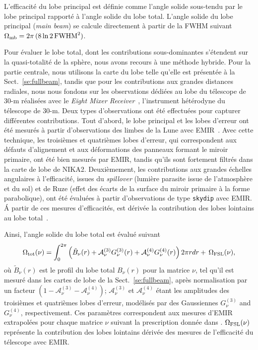 L'efficacité du lobe principal est définie comme l'angle solide
sous-tendu par le lobe principal rapporté à l'angle solide du lobe
total. L'angle solide du lobe principal (\emph{main beam}) se calcule
directement à partir de la FWHM suivant $\Omega_{\rm{mb}} = 2\pi\,
(8\ln{2} \, \rm{FWHM}^2)$.

Pour évaluer le lobe total, dont les contributions sous-dominantes
s'étendent sur la quasi-totalité de la sphère, nous avons recours à
une méthode hybride. Pour la partie centrale, nous utilisons la carte
du lobe telle qu'elle est présentée à la Sect.~\ref{se:fullbeam},
tandis que pour les contributions aux grandes distances radiales, nous
nous fondons sur les observations dédiées au lobe du télescope de 30-m
réalisées avec le \emph{Eight Mixer
  Receiver}~\citep[EMIR][]{Carter2012}, l'instrument hétérodyne du
télescope de 30-m. Deux types d'observations ont été effectuées pour
capturer différentes contributions. Tout d'abord, le lobe principal et
les lobes d'erreur ont été mesurés à partir d'observations des limbes
de la Lune avec EMIR~\citep{Kramer2013}. Avec cette technique, les
troisièmes et quatrièmes lobes d'erreur, qui correspondent aux défauts
d'alignement et aux déformations des panneaux formant le miroir
primaire, ont été bien mesurés par EMIR, tandis qu'ils sont fortement
filtrés dans la carte de lobe de NIKA2. Deuxièmement, les
contributions aux grandes échelles angulaires à l'efficacité, issues
du \emph{spillover} (lumière parasite issue de l'atmosphère et du sol)
et de Ruze (effet des écarts de la surface du miroir primaire à la
forme parabolique), ont été évaluées à partir d'observations de type
{\tt skydip} avec EMIR. \'A partir de ces mesures d'efficacités, est 
dérivée la contribution des lobes lointains au lobe
total~\citep{Kramer2013}.

Ainsi, l'angle solide du lobe total est évalué suivant
\begin{equation}
  \Omega_{\rm{tot}}(\nu) = \int_0^{2\pi} \left( \tilde{B}_{\nu}(r)
  + \mathcal{A}_{\nu}^{(3)} G_{\nu}^{(3)}(r) + \mathcal{A}_{\nu}^{(4)}
  G_{\nu}^{(4)}(r) \right)  2 \pi r dr + \,  \Omega_{\rm{FSL}} (\nu),
  \label{eq:omega_rmax}
\end{equation}
où $\tilde{B}_{\nu}(r)$ est le profil du lobe total
$B_{\nu}(r)$ pour la matrice $\nu$, tel qu'il est mesuré dans les
cartes de lobe de la Sect.~\ref{se:fullbeam}, après normalisation par un facteur 
$(1-\mathcal{A}_{\nu}^{(3)}-\mathcal{A}_{\nu}^{(4)})$;
$\mathcal{A}_{\nu}^{(3)}$ et $\mathcal{A}_{\nu}^{(4)}$ étant les
amplitudes des troisièmes et quatrièmes lobes d'erreur, modélisés par
des Gaussiennes $G_{\nu}^{(3)}$ and $G_{\nu}^{(4)}$,
respectivement. Ces paramètres correspondent aux mesures d'EMIR
extrapolées pour chaque matrice $\nu$ suivant la prescription donnée
dans \citet{Kramer2013}. $\Omega_{\rm{FSL}} (\nu)$ représente la
contribution des lobes lointains dérivée des mesures de l'efficacité
du télescope avec EMIR.

